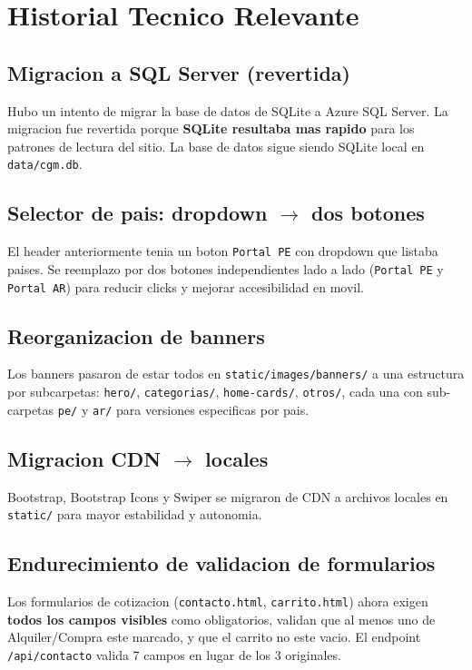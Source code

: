 \documentclass[11pt,a4paper]{article}
\begin{document}
\section{Historial Tecnico Relevante}

\subsection{Migracion a SQL Server (revertida)}
Hubo un intento de migrar la base de datos de SQLite a Azure SQL Server. La
migracion fue revertida porque \textbf{SQLite resultaba mas rapido} para los
patrones de lectura del sitio. La base de datos sigue siendo SQLite local
en \texttt{data/cgm.db}.

\subsection{Selector de pais: dropdown $\rightarrow$ dos botones}
El header anteriormente tenia un boton \texttt{Portal PE} con dropdown que
listaba paises. Se reemplazo por dos botones independientes lado a lado
(\texttt{Portal PE} y \texttt{Portal AR}) para reducir clicks y mejorar
accesibilidad en movil.

\subsection{Reorganizacion de banners}
Los banners pasaron de estar todos en \texttt{static/images/banners/} a una
estructura por subcarpetas: \texttt{hero/}, \texttt{categorias/},
\texttt{home-cards/}, \texttt{otros/}, cada una con sub-carpetas
\texttt{pe/} y \texttt{ar/} para versiones especificas por pais.

\subsection{Migracion CDN $\rightarrow$ locales}
Bootstrap, Bootstrap Icons y Swiper se migraron de CDN a archivos locales
en \texttt{static/} para mayor estabilidad y autonomia.

\subsection{Endurecimiento de validacion de formularios}
Los formularios de cotizacion (\texttt{contacto.html}, \texttt{carrito.html})
ahora exigen \textbf{todos los campos visibles} como obligatorios, validan
que al menos uno de Alquiler/Compra este marcado, y que el carrito no este
vacio. El endpoint \texttt{/api/contacto} valida 7 campos en lugar de los
3 originales.
\end{document}
